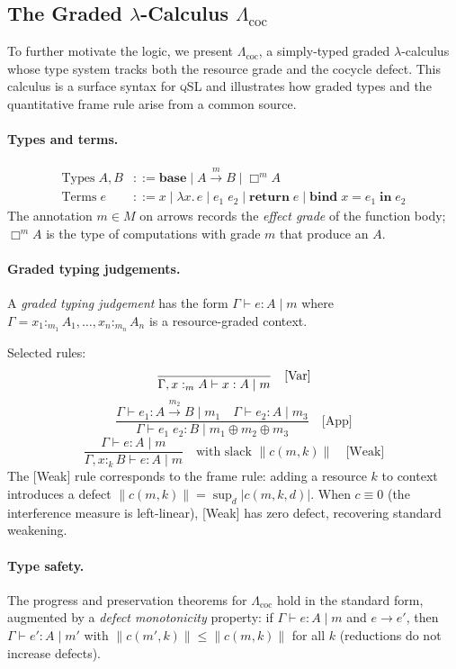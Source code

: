 \documentclass[acmsmall,sigplan,anonymous,review,screen]{acmart}
\newcommand{\inferrule}[2]{%
  \dfrac{\displaystyle #1}{\displaystyle #2}%
}
\theoremstyle{plain}
\theoremstyle{definition}
\newcommand{\qSL}{\textsc{qSL}\xspace}
\begin{document}
\subsection{The Graded $\lambda$-Calculus $\Lambda_{\mathrm{coc}}$}
\label{sec:qsl:lambda}

To further motivate the logic, we present $\Lambda_{\mathrm{coc}}$, a
simply-typed graded $\lambda$-calculus whose type system tracks both the
resource grade and the cocycle defect.  This calculus is a surface syntax
for \qSL and illustrates how graded types and the quantitative frame rule
arise from a common source.

\paragraph{Types and terms.}
\begin{align*}
  \text{Types}\; A, B &::= \mathbf{base} \mid A \xrightarrow{m} B \mid \Box^m A \\
  \text{Terms}\; e &::= x \mid \lambda x.\, e \mid e_1\; e_2 \mid
    \mathbf{return}\; e \mid \mathbf{bind}\; x = e_1\; \mathbf{in}\; e_2
\end{align*}
The annotation $m \in M$ on arrows records the \emph{effect grade} of the
function body; $\Box^m A$ is the type of computations with grade $m$ that
produce an $A$.

\paragraph{Graded typing judgements.}
A \emph{graded typing judgement} has the form
$\Gamma \vdash e : A \mid m$ where $\Gamma = x_1 :_{m_1} A_1, \ldots,
x_n :_{m_n} A_n$ is a resource-graded context.

Selected rules:
\[
  \inferrule{ }{\Gamma, x :_m A \vdash x : A \mid m}
  \quad\text{[Var]}
\]
\[
  \inferrule{\Gamma \vdash e_1 : A \xrightarrow{m_2} B \mid m_1 \quad
             \Gamma \vdash e_2 : A \mid m_3}
            {\Gamma \vdash e_1\; e_2 : B \mid m_1 \oplus m_2 \oplus m_3}
  \quad\text{[App]}
\]
\[
  \inferrule{\Gamma \vdash e : A \mid m}
            {\Gamma, x :_k B \vdash e : A \mid m}
  \quad \text{with slack } \|c(m, k)\|
  \quad\text{[Weak]}
\]
The [Weak] rule corresponds to the frame rule: adding a resource $k$ to
context introduces a defect $\|c(m, k)\| = \sup_d |c(m, k, d)|$.  When
$c \equiv 0$ (the interference measure is left-linear), [Weak] has zero
defect, recovering standard weakening.

\paragraph{Type safety.}
The progress and preservation theorems for $\Lambda_{\mathrm{coc}}$ hold
in the standard form, augmented by a \emph{defect monotonicity} property:
if $\Gamma \vdash e : A \mid m$ and $e \to e'$, then
$\Gamma \vdash e' : A \mid m'$ with $\|c(m', k)\| \leq \|c(m, k)\|$
for all $k$ (reductions do not increase defects).
\end{document}
